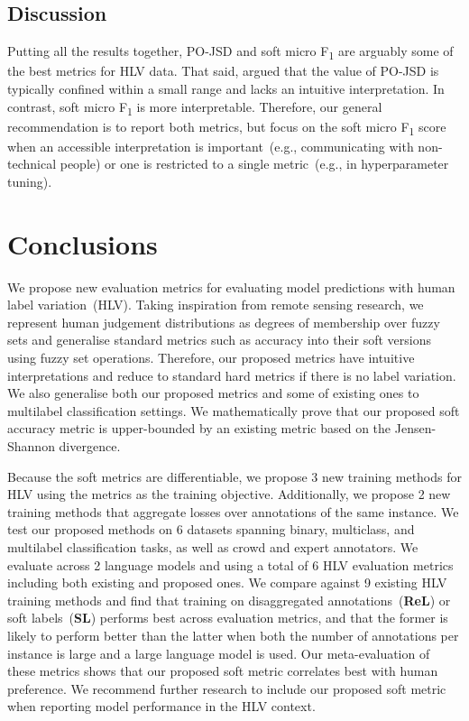 \documentclass[shortpaper]{clv2025}
\newcommand{\pojsd}{PO-JSD\xspace}
\newcommand{\methname}[1]{\textbf{#1}}  %
\begin{document}
\subsection{Discussion}

Putting all the results together, \pojsd and soft micro F\textsubscript{1} are arguably
some of the best metrics for HLV data.
That said, \citet{uma2021} argued that the value of \pojsd is typically confined within a small
range and lacks an intuitive interpretation. In
contrast, soft micro F\textsubscript{1} is more interpretable. Therefore, our general recommendation is to
report both metrics, but focus on the soft micro F\textsubscript{1} score when an
accessible interpretation is important~(e.g., communicating with non-technical
people) or one is restricted to a single metric~(e.g., in hyperparameter
tuning).

\section{Conclusions}

We propose new evaluation metrics for evaluating model predictions with human
label variation~(HLV). Taking inspiration from remote sensing research, we
represent human judgement distributions as degrees of membership over fuzzy sets
and generalise standard metrics such as accuracy into their soft versions using
fuzzy set operations. Therefore, our proposed metrics have intuitive
interpretations and reduce to standard hard metrics if there is no label
variation. We also generalise both our proposed metrics and some of existing
ones to multilabel classification settings. We mathematically prove that our
proposed soft accuracy metric is upper-bounded by an existing metric based on
the Jensen-Shannon divergence.

Because the soft metrics are differentiable, we propose 3 new training methods for
HLV using the metrics as the training objective. Additionally, we propose 2 new
training methods that aggregate losses over annotations of the same instance. We
test our proposed methods on 6 datasets spanning binary, multiclass, and
multilabel classification tasks, as well as crowd and expert annotators. We
evaluate across 2 language models and using a total of 6 HLV evaluation metrics
including both existing and proposed ones. We compare against 9 existing HLV
training methods and find that training on disaggregated
annotations~(\methname{ReL}) or soft labels~(\methname{SL}) performs best across
evaluation metrics, and that the former is likely to perform better than the
latter when both the number of annotations per instance is large and a large
language model is used. Our meta-evaluation of these metrics shows that our
proposed soft metric correlates best with human preference. We recommend further
research to include our proposed soft metric when reporting model performance in
the HLV context.
\end{document}
